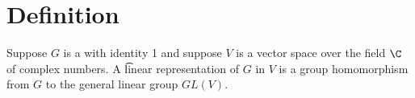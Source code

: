 

\section*{Definition}

Suppose $G$ is a with identity 1 and suppose $V$ is a vector space over the field $\C $ of complex numbers.
A \t{linear representation} of $G$ in $V$ is a group homomorphism from $G$ to the general linear group $GL(V)$.

\blankpage